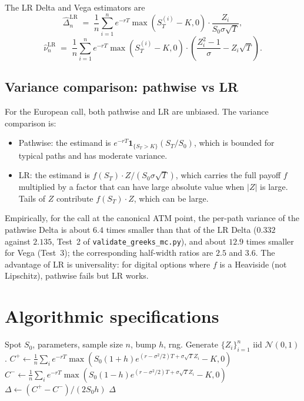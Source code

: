 \documentclass[11pt,a4paper]{article}
\theoremstyle{plain}
\theoremstyle{definition}
\theoremstyle{remark}
\newcommand{\indic}{\mathbf{1}}
\begin{document}
The LR Delta and Vega estimators are
\begin{equation}
\widehat{\Delta}_n^{\mathrm{LR}}
\;=\; \frac{1}{n} \sum_{i=1}^n e^{-rT} \max(S_T^{(i)} - K, 0)
\cdot \frac{Z_i}{S_0 \sigma \sqrt T},
\end{equation}
\begin{equation}
\widehat{\nu}_n^{\mathrm{LR}}
\;=\; \frac{1}{n} \sum_{i=1}^n e^{-rT} \max(S_T^{(i)} - K, 0)
\cdot \left(\frac{Z_i^2 - 1}{\sigma} - Z_i \sqrt T\right).
\end{equation}

\subsection{Variance comparison: pathwise vs LR}

For the European call, both pathwise and LR are unbiased. The
variance comparison is:
\begin{itemize}
\item Pathwise: the estimand is $e^{-rT}\indic_{\{S_T>K\}}(S_T/S_0)$,
which is bounded for typical paths and has moderate variance.
\item LR: the estimand is $f(S_T) \cdot Z / (S_0 \sigma \sqrt T)$,
which carries the full payoff $f$ multiplied by a factor that can
have large absolute value when $|Z|$ is large. Tails of $Z$
contribute $f(S_T) \cdot Z$, which can be large.
\end{itemize}
Empirically, for the call at the canonical ATM point, the per-path
variance of the pathwise Delta is about $6.4$ times smaller than that
of the LR Delta ($0.332$ against $2.135$, Test~2 of
\texttt{validate\_greeks\_mc.py}), and about $12.9$ times smaller for
Vega (Test~3); the corresponding half-width ratios are $2.5$ and
$3.6$. The advantage of LR is universality:
for digital options where $f$ is a Heaviside (not Lipschitz),
pathwise fails but LR works.

\section{Algorithmic specifications}
\label{sec:algorithms}

\begin{algorithm}[H]
\caption{Bump-and-revalue Delta with central differences and CRN}
\label{alg:bump}
\begin{algorithmic}[1]
\Require Spot $S_0$, parameters, sample size $n$, bump $h$, rng.
\State Generate $\{Z_i\}_{i=1}^n$ iid $\mathcal N(0,1)$.
\State $C^+ \gets \frac{1}{n} \sum_i e^{-rT} \max(S_0(1+h) e^{(r-\sigma^2/2)T + \sigma\sqrt T Z_i} - K, 0)$
\State $C^- \gets \frac{1}{n} \sum_i e^{-rT} \max(S_0(1-h) e^{(r-\sigma^2/2)T + \sigma\sqrt T Z_i} - K, 0)$
\State $\Delta \gets (C^+ - C^-)/(2 S_0 h)$
\State \Return $\Delta$
\end{algorithmic}
\end{algorithm}
\end{document}
